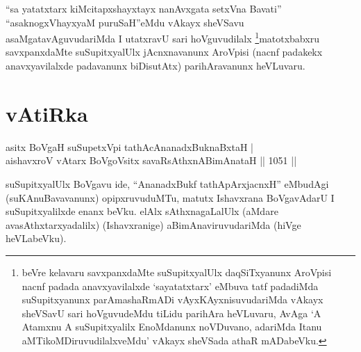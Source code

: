 \begin{artha}
``sa yatatxtarx kiMcitapxshayxtayx nanAvxgata setxVna Bavati'' ``asaknogxVhayxyaM puruSaH''eMdu vAkayx sheVSavu asaMgatavAguvudariMda I utatxravU sari hoVguvudilalx \footnote{beVre kelavaru savxpanxdaMte suSupitxyalUlx daqSiTxyanunx AroVpisi nacnf padada anavxyavilalxde `sayatatxtarx' eMbuva tatf padadiMda suSupitxyanunx parAmashaRmADi vAyxKAyxnisuvudariMda vAkayx sheVSavU sari hoVguvudeMdu tiLidu parihAra heVLuvaru, AvAga `A Atamxnu A suSupitxyalilx EnoMdanunx noVDuvano, adariMda Itanu aMTikoMDiruvudilalxveMdu' vAkayx sheVSada athaR mADabeVku.}matotxbabxru savxpanxdaMte suSupitxyalUlx jAcnxnavanunx AroVpisi (nacnf padakekx anavxyavilalxde padavanunx biDisutAtx) parihAravanunx heVLuvaru.
\end{artha}

\section*{vAtiRka}


\begin{shl}
\footnotemark[1]asitx BoVgaH suSupetxV\s pi tathAcA\s \s nanadxBuknaBxtaH | \\
\footnotemark[2]aishavxroV vA\s tarx BoVgoV\s sitx savaRsAthxnABimAnataH \hfill||  1051 ||  
\end{shl}

\begin{artha}
suSupitxyalUlx BoVgavu ide, ``AnanadxBukf tathApArxjacnxH'' eMbudAgi (suKAnuBavavanunx) opipxruvuduMTu, matutx Ishavxrana BoVgavAdarU I suSupitxyalilxde enanx beVku. elAlx sAthxnagaLalUlx (aMdare avasAthxtarxyadalilx) (Ishavxranige) aBimAnaviruvudariMda (hiVge heVLabeVku).
\end{artha}

